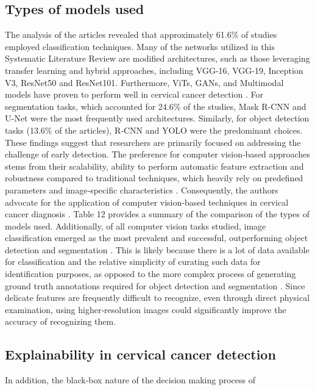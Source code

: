 \documentclass[final,5p,times,twocolumn,authoryear]{elsarticle}
\begin{document}
\subsection{Types of models used}
The analysis of the articles revealed that approximately 61.6\% of studies employed classification techniques. Many of the networks utilized in this Systematic Literature Review are modified architectures, such as those leveraging transfer learning and hybrid approaches, including VGG-16, VGG-19, Inception V3, ResNet50 and ResNet101. Furthermore, ViTs, GANs, and Multimodal models have proven to perform well in cervical cancer detection \cite{ref35,ref98,ref122}.
For segmentation tasks, which accounted for 24.6\% of the studies, Mask R‑CNN and U‑Net were the most frequently used architectures. Similarly, for object detection tasks (13.6\% of the articles), R‑CNN and YOLO were the predominant choices. These findings suggest that researchers are primarily focused on addressing the challenge of early detection. The preference for computer vision‑based approaches stems from their scalability, ability to perform automatic feature extraction and robustness \cite{ref64} compared to traditional techniques, which heavily rely on predefined parameters and image‑specific characteristics \cite{ref19}. Consequently, the authors advocate for the application of computer vision‑based techniques in cervical cancer diagnosis \cite{ref18}. Table 12 provides a summary of the comparison of the types of models used.
Additionally, of all computer vision tasks studied, image classification emerged as the most prevalent and successful, outperforming object detection and segmentation \cite{ref42,ref43,ref60}. This is likely because there is a lot of data available for classification and the relative simplicity of curating such data for identification purposes, as opposed to the more complex process of generating ground truth annotations required for object detection and segmentation \cite{ref6,ref17,ref18,ref19}. Since delicate features are frequently difficult to recognize, even through direct physical examination, using higher‑resolution images could significantly improve the accuracy of recognizing them.
\subsection{Explainability in cervical cancer detection}
In addition, the black‑box nature of the decision making process of
\end{document}
